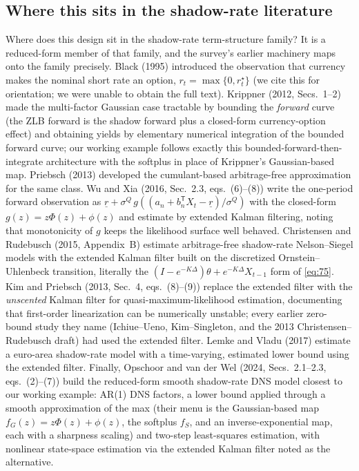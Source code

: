 \documentclass[11pt]{article}
\begin{document}
\subsection{Where this sits in the shadow-rate literature}
\label{sec:shadow-lit}

Where does this design sit in the shadow-rate term-structure family? It is a
reduced-form member of that family, and the survey's earlier machinery maps
onto the family precisely. Black (1995) introduced the observation that currency makes
the nominal short rate an option, \(r_t=\max\{0,r_t^\star\}\) (we cite
this for orientation; we were unable to obtain the full text). Krippner
(2012, Secs.~1--2) made the multi-factor Gaussian case tractable by
bounding the \emph{forward} curve (the ZLB forward is the shadow
forward plus a closed-form currency-option effect) and obtaining
yields by elementary numerical integration of the bounded forward
curve; our working example follows exactly this
bounded-forward-then-integrate architecture with the softplus in place
of Krippner's Gaussian-based map. Priebsch (2013) developed the
cumulant-based arbitrage-free approximation for the same class. Wu and
Xia (2016, Sec.~2.3, eqs.~(6)--(8)) write the one-period forward
observation as
\(\underline r+\sigma^Q\,g\!\left((a_n+b_n^{\mathsf T}X_t-\underline r)/
\sigma^Q\right)\) with the closed-form \(g(z)=z\Phi(z)+\phi(z)\) and
estimate by extended Kalman filtering, noting that monotonicity of
\(g\) keeps the likelihood surface well behaved. Christensen and
Rudebusch (2015, Appendix~B) estimate arbitrage-free shadow-rate
Nelson--Siegel models with the extended Kalman filter built on the
discretized Ornstein--Uhlenbeck transition, literally the
\((I-e^{-K\Delta})\theta+e^{-K\Delta}X_{t-1}\) form of \eqref{eq:75}.
Kim and Priebsch (2013, Sec.~4, eqs.~(8)--(9)) replace the extended
filter with the \emph{unscented} Kalman filter for
quasi-maximum-likelihood estimation, documenting that first-order
linearization can be numerically unstable; every earlier zero-bound
study they name (Ichiue--Ueno, Kim--Singleton, and the 2013
Christensen--Rudebusch draft) had used the extended filter. Lemke
and Vladu (2017) estimate a euro-area shadow-rate model with a
time-varying, estimated lower bound using the extended filter. Finally,
Opschoor and van der Wel (2024, Secs.~2.1--2.3, eqs.~(2)--(7)) build
the reduced-form smooth shadow-rate DNS model closest to our working
example: AR(1) DNS factors, a lower bound applied through a smooth
approximation of the max (their menu is the Gaussian-based map
\(f_G(z)=z\Phi(z)+\phi(z)\), the softplus \(f_S\), and an
inverse-exponential map, each with a sharpness scaling) and two-step
least-squares estimation, with nonlinear state-space estimation via the
extended Kalman filter noted as the alternative.
\end{document}
